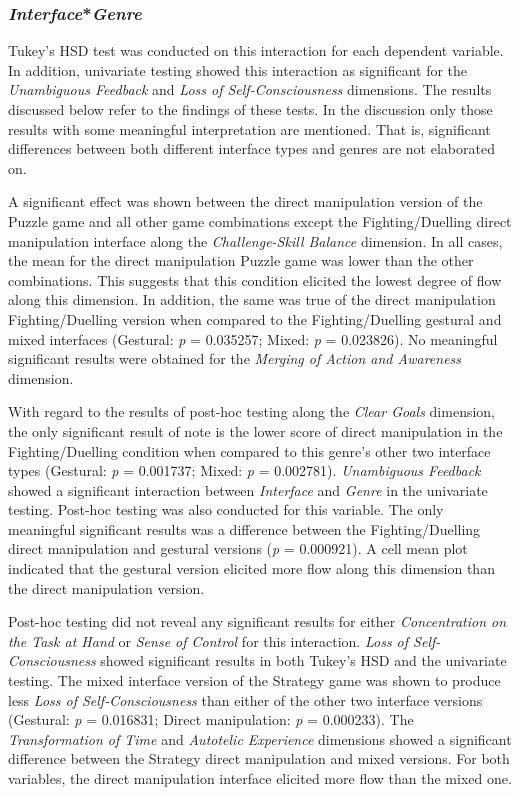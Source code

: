 \subsubsection{\emph{Interface}*\emph{Genre}}
Tukey's HSD test was conducted on this interaction for each dependent variable. In addition, univariate testing showed this interaction as significant for the \emph{Unambiguous Feedback} and \emph{Loss of Self-Consciousness} dimensions. The results discussed below refer to the findings of these tests. In the discussion only those results with some meaningful interpretation are mentioned. That is, significant differences between both different interface types and genres are not elaborated on.

A significant effect was shown between the direct manipulation version of the Puzzle game and all other game combinations except the Fighting/Duelling direct manipulation interface along the \emph{Challenge-Skill Balance} dimension. In all cases, the mean for the direct manipulation Puzzle game was lower than the other combinations. This suggests that this condition elicited the lowest degree of flow along this dimension. In addition, the same was true of the direct manipulation Fighting/Duelling version when compared to the Fighting/Duelling gestural and mixed interfaces (Gestural: \emph{p} = 0.035257; Mixed: \emph{p} = 0.023826). No meaningful significant results were obtained for the \emph{Merging of Action and Awareness} dimension.

With regard to the results of post-hoc testing along the \emph{Clear Goals} dimension, the only significant result of note is the lower score of direct manipulation in the Fighting/Duelling condition when compared to this genre's other two interface types (Gestural: \emph{p} = 0.001737; Mixed: \emph{p} = 0.002781). \emph{Unambiguous Feedback} showed a significant interaction between \emph{Interface} and \emph{Genre} in the univariate testing. Post-hoc testing was also conducted for this variable. The only meaningful significant results was a difference between the Fighting/Duelling direct manipulation and gestural versions (\emph{p} =  0.000921). A cell mean plot indicated that the gestural version elicited more flow along this dimension than the direct manipulation version.

Post-hoc testing did not reveal any significant results for either \emph{Concentration on the Task at Hand} or \emph{Sense of Control} for this interaction. \emph{Loss of Self-Consciousness} showed significant results in both Tukey's HSD and the univariate testing. The mixed interface version of the Strategy game was shown to produce less \emph{Loss of Self-Consciousness} than either of the other two interface versions (Gestural: \emph{p} = 0.016831; Direct manipulation: \emph{p} = 0.000233). The \emph{Transformation of Time} and \emph{Autotelic Experience} dimensions showed a significant difference between the Strategy direct manipulation and mixed versions. For both variables, the direct manipulation interface elicited more flow than the mixed one.

